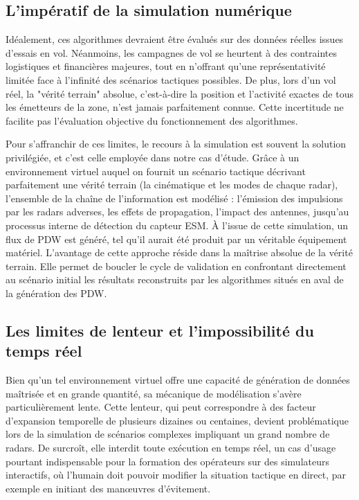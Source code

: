 \subsection{L'impératif de la simulation numérique}

Idéalement, ces algorithmes devraient être évalués sur des données réelles issues d'essais en vol. Néanmoins, les campagnes de vol se heurtent à des contraintes logistiques et financières majeures, tout en n'offrant qu'une représentativité limitée face à l'infinité des scénarios tactiques possibles. De plus, lors d'un vol réel, la "vérité terrain" absolue, c'est-à-dire la position et l'activité exactes de tous les émetteurs de la zone, n'est jamais parfaitement connue. Cette incertitude ne facilite pas l'évaluation objective du fonctionnement des algorithmes.

Pour s'affranchir de ces limites, le recours à la simulation est souvent la solution privilégiée, et c'est celle employée dans notre cas d'étude. Grâce à un environnement virtuel auquel on fournit un scénario tactique décrivant parfaitement une vérité terrain (la cinématique et les modes de chaque radar), l'ensemble de la chaîne de l'information est modélisé : l'émission des impulsions par les radars adverses, les effets de propagation, l'impact des antennes, jusqu'au processus interne de détection du capteur ESM. À l'issue de cette simulation, un flux de PDW est généré, tel qu'il aurait été produit par un véritable équipement matériel. L'avantage de cette approche réside dans la maîtrise absolue de la vérité terrain. Elle permet de boucler le cycle de validation en confrontant directement au scénario initial les résultats reconstruits par les algorithmes situés en aval de la génération des PDW.

\subsection{Les limites de lenteur et l'impossibilité du temps réel}

Bien qu'un tel environnement virtuel offre une capacité de génération de données maîtrisée et en grande quantité, sa mécanique de modélisation s'avère particulièrement lente. Cette lenteur, qui peut correspondre à des facteur d'expansion temporelle de plusieurs dizaines ou centaines, devient problématique lors de la simulation de scénarios complexes impliquant un grand nombre de radars. De surcroît, elle interdit toute exécution en temps réel, un cas d'usage pourtant indispensable pour la formation des opérateurs sur des simulateurs interactifs, où l'humain doit pouvoir modifier la situation tactique en direct, par exemple en initiant des manœuvres d'évitement.

